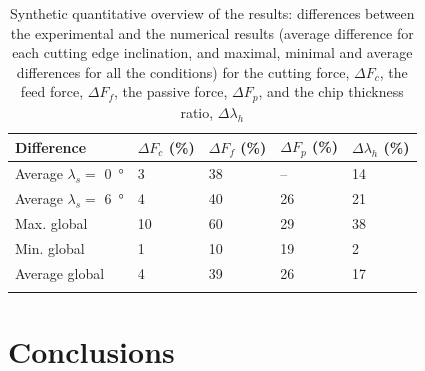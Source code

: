 \documentclass[preprint,12pt,times]{elsarticle}
\newcommand{\snsp}[2]{{#1}_{\!#2}}    %
\begin{document}
%
\begin{table}[!h]
\begin{center}
\caption{\label{tab:Synth} Synthetic quantitative overview of the results: differences between the experimental and the numerical results (average difference for each cutting edge inclination, and maximal, minimal and average differences for all the conditions) for the cutting force, $\Delta \snsp{F}{c}$, the feed force, $\Delta \snsp{F}{f}$, the passive force, $\Delta \snsp{F}{p}$, and the chip thickness ratio, $\Delta \lambda_h$}
\begin{tabular}{lllll}
\hline\noalign{\smallskip}
Difference & $\Delta \snsp{F}{c}$ (\unit{\%}) & $\Delta \snsp{F}{f}$ (\unit{\%}) & $\Delta \snsp{F}{p}$ (\unit{\%}) & $\Delta \lambda_h$ (\unit{\%})\\
\hline\noalign{\smallskip}
Average $\lambda_s =$ \qty{0}{\degree} & 3 & 38 & -- & 14\\
Average $\lambda_s =$ \qty{6}{\degree} & 4 & 40 & 26 & 21\\
Max. global & 10 & 60 & 29 & 38\\
Min. global & 1 & 10 & 19 & 2\\
Average global & 4 & 39 & 26 & 17\\
\noalign{\smallskip}\hline\noalign{\smallskip}
\end{tabular}
\end{center}
\end{table}
%

\section{Conclusions}
\end{document}
